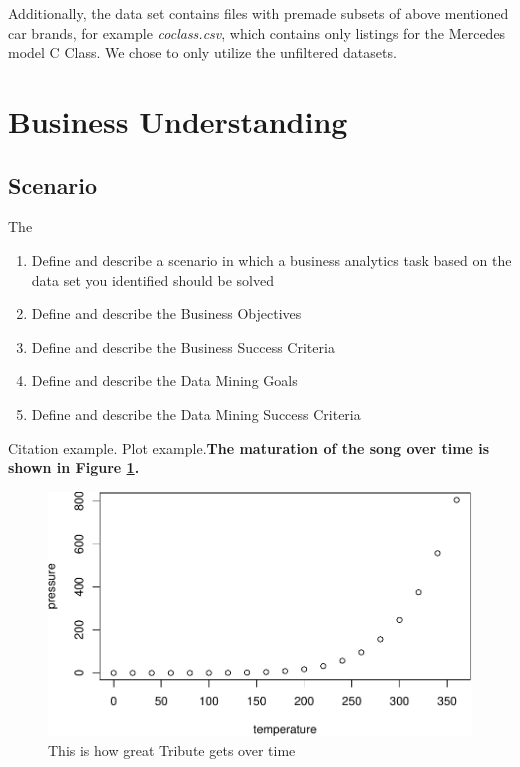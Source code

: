 \documentclass[sigchi]{acmart}
\def\tightlist{}
\begin{document}
Additionally, the data set contains files with premade subsets of above mentioned car brands, for example \emph{coclass.csv}, which contains only listings for the Mercedes model C Class. We chose to only utilize the unfiltered datasets.

\hypertarget{business-understanding}{%
\section{Business Understanding}\label{business-understanding}}

\hypertarget{scenario}{%
\subsection{Scenario}\label{scenario}}

The

\begin{enumerate}
\def\labelenumi{\alph{enumi}.}
\tightlist
\item
  Define and describe a scenario in which a business analytics task based on the data set you identified should be solved
\item
  Define and describe the Business Objectives
\item
  Define and describe the Business Success Criteria
\item
  Define and describe the Data Mining Goals
\item
  Define and describe the Data Mining Success Criteria
\end{enumerate}

Citation example.\citep{Aditya}
Plot example.\textbf{The maturation of the song over time is shown in Figure \ref{fig:tribute-plot}.}

\begin{figure}
\includegraphics[width=0.98\columnwidth]{step6_files/figure-latex/tribute-plot-1} \caption{This is how great Tribute gets over time}\label{fig:tribute-plot}
\end{figure}
\end{document}
